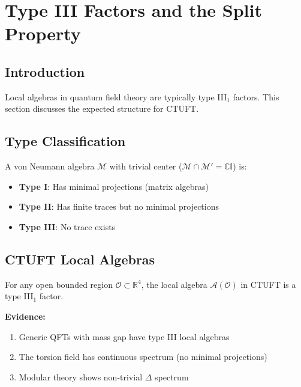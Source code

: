 \section{Type III Factors and the Split Property}
\label{sec:type_III}

\subsection{Introduction}

Local algebras in quantum field theory are typically type III$_1$ factors. This section discusses the expected structure for CTUFT.

\subsection{Type Classification}

\begin{definition}
A von Neumann algebra $\mathcal{M}$ with trivial center ($\mathcal{M} \cap \mathcal{M}' = \mathbb{C}\mathbb{I}$) is:
\begin{itemize}
    \item \textbf{Type I}: Has minimal projections (matrix algebras)
    \item \textbf{Type II}: Has finite traces but no minimal projections
    \item \textbf{Type III}: No trace exists
\end{itemize}
\end{definition}

\subsection{CTUFT Local Algebras}

\begin{conjecture}
For any open bounded region $\mathcal{O} \subset \mathbb{R}^4$, the local algebra $\mathcal{A}(\mathcal{O})$ in CTUFT is a type III$_1$ factor.
\end{conjecture}

\textbf{Evidence:}
\begin{enumerate}
    \item Generic QFTs with mass gap have type III local algebras
    \item The torsion field has continuous spectrum (no minimal projections)
    \item Modular theory shows non-trivial $\Delta$ spectrum
\end{enumerate}

